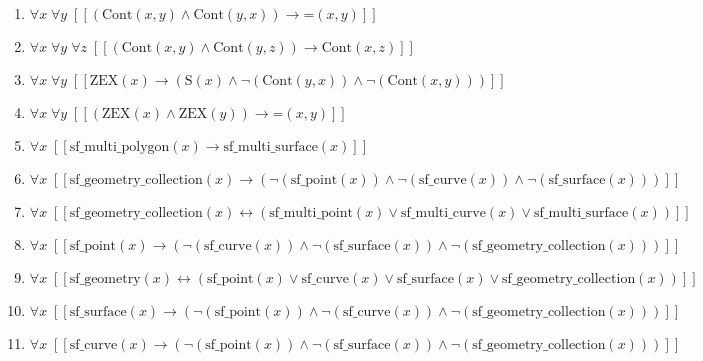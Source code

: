 \documentclass{article}
\begin{document}
\begin{enumerate}
\item $\forall x\; \forall y\;  \left[ \left[ \left(\textrm{Cont}(x,y) \land \textrm{Cont}(y,x)\right) \rightarrow \textrm{=}(x,y) \right] \right]$
\item $\forall x\; \forall y\; \forall z\;  \left[ \left[ \left(\textrm{Cont}(x,y) \land \textrm{Cont}(y,z)\right) \rightarrow \textrm{Cont}(x,z) \right] \right]$
\item $\forall x\; \forall y\;  \left[ \left[ \textrm{ZEX}(x) \rightarrow \left(\textrm{S}(x) \land \neg \left(\textrm{Cont}(y,x)\right) \land \neg \left(\textrm{Cont}(x,y)\right)\right) \right] \right]$
\item $\forall x\; \forall y\;  \left[ \left[ \left(\textrm{ZEX}(x) \land \textrm{ZEX}(y)\right) \rightarrow \textrm{=}(x,y) \right] \right]$
\item $\forall x\;  \left[ \left[ \textrm{sf\_multi\_polygon}(x) \rightarrow \textrm{sf\_multi\_surface}(x) \right] \right]$
\item $\forall x\;  \left[ \left[ \textrm{sf\_geometry\_collection}(x) \rightarrow \left(\neg \left(\textrm{sf\_point}(x)\right) \land \neg \left(\textrm{sf\_curve}(x)\right) \land \neg \left(\textrm{sf\_surface}(x)\right)\right) \right] \right]$
\item $\forall x\;  \left[ \left[ \textrm{sf\_geometry\_collection}(x) \leftrightarrow \left(\textrm{sf\_multi\_point}(x) \lor \textrm{sf\_multi\_curve}(x) \lor \textrm{sf\_multi\_surface}(x)\right) \right] \right]$
\item $\forall x\;  \left[ \left[ \textrm{sf\_point}(x) \rightarrow \left(\neg \left(\textrm{sf\_curve}(x)\right) \land \neg \left(\textrm{sf\_surface}(x)\right) \land \neg \left(\textrm{sf\_geometry\_collection}(x)\right)\right) \right] \right]$
\item $\forall x\;  \left[ \left[ \textrm{sf\_geometry}(x) \leftrightarrow \left(\textrm{sf\_point}(x) \lor \textrm{sf\_curve}(x) \lor \textrm{sf\_surface}(x) \lor \textrm{sf\_geometry\_collection}(x)\right) \right] \right]$
\item $\forall x\;  \left[ \left[ \textrm{sf\_surface}(x) \rightarrow \left(\neg \left(\textrm{sf\_point}(x)\right) \land \neg \left(\textrm{sf\_curve}(x)\right) \land \neg \left(\textrm{sf\_geometry\_collection}(x)\right)\right) \right] \right]$
\item $\forall x\;  \left[ \left[ \textrm{sf\_curve}(x) \rightarrow \left(\neg \left(\textrm{sf\_point}(x)\right) \land \neg \left(\textrm{sf\_surface}(x)\right) \land \neg \left(\textrm{sf\_geometry\_collection}(x)\right)\right) \right] \right]$

\end{enumerate}
\end{document}
